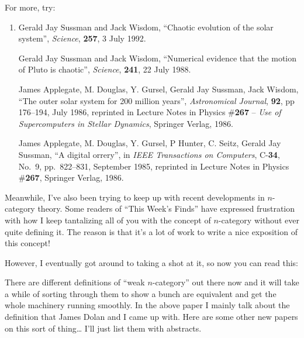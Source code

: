 \documentclass{article}
\def\tightlist{}
\renewcommand{\texttt}[1]{%
  \begingroup
  \ttfamily
  \begingroup\lccode`~=`/\lowercase{\endgroup\def~}{/\discretionary{}{}{}}%
  \begingroup\lccode`~=`[\lowercase{\endgroup\def~}{[\discretionary{}{}{}}%
  \begingroup\lccode`~=`.\lowercase{\endgroup\def~}{.\discretionary{}{}{}}%
  \catcode`/=\active\catcode`[=\active\catcode`.=\active
  \scantokens{#1\noexpand}%
  \endgroup
}
\begin{document}
For more, try:

\begin{enumerate}
\def\labelenumi{\arabic{enumi})}
\setcounter{enumi}{3}
\item
  Gerald Jay Sussman and Jack Wisdom, ``Chaotic evolution of the solar
  system'', \emph{Science}, \textbf{257}, 3 July 1992.

  Gerald Jay Sussman and Jack Wisdom, ``Numerical evidence that the
  motion of Pluto is chaotic'', \emph{Science}, \textbf{241}, 22 July
  1988.

  James Applegate, M. Douglas, Y. Gursel, Gerald Jay Sussman, Jack
  Wisdom, ``The outer solar system for 200 million years'',
  \emph{Astronomical Journal}, \textbf{92}, pp 176--194, July 1986,
  reprinted in Lecture Notes in Physics \#\textbf{267} -- \emph{Use of
  Supercomputers in Stellar Dynamics}, Springer Verlag, 1986.

  James Applegate, M. Douglas, Y. Gursel, P Hunter, C. Seitz, Gerald Jay
  Sussman, ``A digital orrery'', in \emph{IEEE Transactions on
  Computers}, C-\textbf{34}, No.~9, pp.~822--831, September 1985,
  reprinted in Lecture Notes in Physics \#\textbf{267}, Springer Verlag,
  1986.
\end{enumerate}

Meanwhile, I've also been trying to keep up with recent developments in
\(n\)-category theory. Some readers of ``This Week's Finds'' have
expressed frustration with how I keep tantalizing all of you with the
concept of \(n\)-category without ever quite defining it. The reason is
that it's a lot of work to write a nice exposition of this concept!

However, I eventually got around to taking a shot at it, so now you can
read this:


There are different definitions of ``weak \(n\)-category'' out there now
and it will take a while of sorting through them to show a bunch are
equivalent and get the whole machinery running smoothly. In the above
paper I mainly talk about the definition that James Dolan and I came up
with. Here are some other new papers on this sort of thing\ldots{} I'll
just list them with abstracts.
\end{document}
